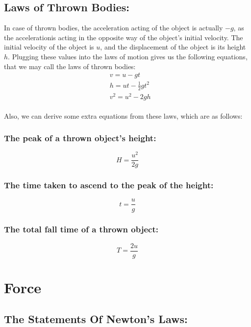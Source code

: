 \documentclass[a4paper]{report}
\begin{document}
    \section{Laws of Thrown Bodies: }
        In case of thrown bodies, the acceleration acting of the object is actually $-g$, as the accelerationis acting in the opposite way of the object's initial velocity. The initial velocity of the object is $u$, and the displacement of the object is its height $h$. Plugging these values into the laws of motion gives us the following equations, that we may call the laws of thrown bodies:
        \\
        \begin{eqnarray}
            &v = u - gt \\
            &h = ut - \frac{1}{2}gt^2 \\
            &v^2 = u^2 - 2gh
        \end{eqnarray}
        \\
        Also, we can derive some extra equations from these laws, which are as follows:
        \subsection{The peak of a thrown object's height: }
            \begin{equation}
                H = \frac{u^2}{2g}
            \end{equation}
        \subsection{The time taken to ascend to the peak of the height: }
            \begin{equation}
                t = \frac{u}{g}
            \end{equation}
        \subsection{The total fall time of a thrown object: }
            \begin{equation}
                T = \frac{2u}{g}
            \end{equation}
        

\chapter{Force}
    \section{The Statements Of Newton's Laws: }
\end{document}
